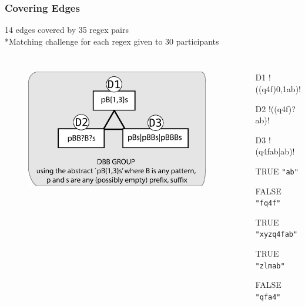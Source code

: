 
\begin{frame}[fragile]
\frametitle{Covering Edges}
\begin{center}
14 edges covered by 35 regex pairs
\\*Matching challenge for each regex given to 30 participants
\end{center}
\begin{columns}[t]
\begin{figure}
  \includegraphics[scale=0.35]{nontex/illustrations/DBBExample.eps}
  \label{fig:DBBExample}
\end{figure}
\begin{itemize}
\item[D1] \cverb!((q4f){0,1}ab)!
\item[D2] \cverb!((q4f)?ab)!
\item[D3] \cverb!(q4fab|ab)!
\item[TRUE] \verb|"ab"|
\item[FALSE] \verb|"fq4f"|
\item[TRUE] \verb|"xyzq4fab"|
\item[TRUE] \verb|"zlmab"|
\item[FALSE] \verb|"qfa4"|
\end{itemize}
\end{columns}
\end{frame}


